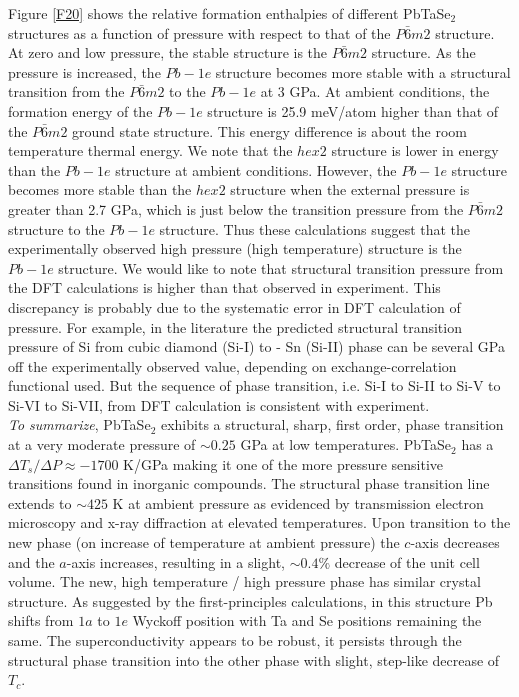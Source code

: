 \documentclass[aps,prb,preprint,groupedaddress,showpacs,amsmath,amssymb]{revtex4}
\begin{document}
Figure \ref{F20} shows the relative formation enthalpies of different PbTaSe$_2$ structures as a function of pressure with respect to that of the $P\bar{6}m2$ structure. At zero and low pressure, the stable structure is the $P\bar{6}m2$ structure. As the pressure is increased, the $Pb{-}1e$ structure becomes more stable with a structural transition from the $P\bar{6}m2$ to the $Pb{-}1e$  at 3 GPa. At ambient conditions, the formation energy of the $Pb{-}1e$ structure is 25.9 meV/atom higher than that of the $P\bar{6}m2$ ground state structure. This energy difference is about the room temperature thermal energy. We note that the $hex2$ structure is lower in energy than the $Pb{-}1e$ structure at ambient conditions. However, the $Pb{-}1e$ structure becomes more stable than the $hex2$ structure when the external pressure is greater than 2.7 GPa, which is just below the transition pressure from the $P\bar{6}m2$ structure to the $Pb{-}1e$ structure. Thus these calculations suggest that the experimentally observed high pressure (high temperature) structure is the $Pb{-}1e$ structure. We would like to note that structural transition pressure from the DFT calculations is higher than that observed in experiment. This discrepancy is probably due to the systematic error in DFT calculation of pressure. For example, in the literature the predicted structural transition pressure of Si from cubic diamond (Si-I) to - Sn (Si-II) phase can be several GPa off the experimentally observed value, depending on exchange-correlation functional used.\cite{muj03a,hen10a}  But the sequence of phase transition, i.e. Si-I to Si-II to Si-V to Si-VI to Si-VII, from DFT calculation is consistent with experiment. \cite{muj03a}
\\

{\it To summarize},  PbTaSe$_2$ exhibits a structural, sharp, first order, phase transition at a very moderate pressure of $\sim 0.25$ GPa at low temperatures. PbTaSe$_2$ has a $\Delta T_s/\Delta P \approx - 1700$ K/GPa making it one of the more pressure sensitive transitions found  in inorganic compounds. The structural phase transition line extends to $\sim 425$ K at ambient pressure as evidenced by transmission electron microscopy and x-ray diffraction at elevated temperatures. Upon transition to the new phase (on increase of temperature at ambient pressure) the $c$-axis decreases and the $a$-axis increases, resulting in a slight, $\sim 0.4 \%$ decrease of the unit cell volume. The new, high temperature / high pressure phase has similar crystal structure.  As suggested by the first-principles calculations, in  this structure Pb shifts from $1a$  to $1e$ Wyckoff position with Ta and Se positions remaining the same.
The superconductivity appears to be robust, it persists through the structural phase transition into the other phase with slight, step-like decrease of $T_c$.
\end{document}
